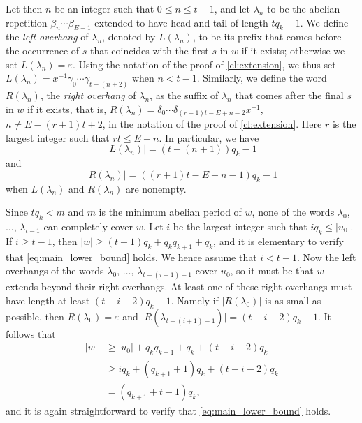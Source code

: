 \documentclass[a4paper,fleqn]{article}
\providecommand{\abs}[1]{\lvert#1\rvert}
\begin{document}
  Let then $n$ be an integer such that $0 \leq n \leq t - 1$, and let $\lambda_n$ to be the abelian repetition
  $\beta_n \dotsm \beta_{E-1}$ extended to have head and tail of length $tq_k - 1$. We define the \emph{left overhang}
  of $\lambda_n$, denoted by $L(\lambda_n)$, to be its prefix that comes before the occurrence of $s$ that coincides
  with the first $s$ in $w$ if it exists; otherwise we set $L(\lambda_n) = \varepsilon$. Using the notation of the
  proof of \autoref{cl:extension}, we thus set $L(\lambda_n) = x^{-1} \gamma_0 \dotsm \gamma_{t - (n + 2)}$ when
  $n < t - 1$. Similarly, we define the word $R(\lambda_n)$, the \emph{right overhang} of $\lambda_n$, as the suffix of
  $\lambda_n$ that comes after the final $s$ in $w$ if it exists, that is, $R(\lambda_n) = \delta_0 \dotsm
  \delta_{(r+1)t - E + n - 2}x^{-1}$, $n \neq E - (r + 1)t + 2$, in the notation of the proof of
  \autoref{cl:extension}. Here $r$ is the largest integer such that $rt \leq E - n$. In particular, we have
  \begin{equation*}
    \abs{L(\lambda_n)} = (t - (n + 1))q_k - 1
  \end{equation*}
  and
  \begin{equation*}
    \abs{R(\lambda_n)} = ((r + 1)t - E + n - 1)q_k - 1
  \end{equation*}
  when $L(\lambda_n)$ and $R(\lambda_n)$ are nonempty.

  Since $tq_k < m$ and $m$ is the minimum abelian period of $w$, none of the words $\lambda_0$, $\ldots$,
  $\lambda_{t-1}$ can completely cover $w$. Let $i$ be the largest integer such that $iq_k \leq \abs{u_0}$. If
  $i \geq t - 1$, then $\abs{w} \geq (t - 1)q_k + q_k q_{k+1} + q_k$, and it is elementary to verify that
  \eqref{eq:main_lower_bound} holds. We hence assume that $i < t - 1$. Now the left overhangs of the words $\lambda_0$,
  $\ldots$, $\lambda_{t - (i + 1) - 1}$ cover $u_0$, so it must be that $w$ extends beyond their right overhangs. At
  least one of these right overhangs must have length at least $(t - i - 2)q_k - 1$. Namely if $\abs{R(\lambda_0)}$ is
  as small as possible, then $R(\lambda_0) = \varepsilon$ and
  $\abs{R(\lambda_{t - (i + 1) - 1})} = (t - i - 2)q_k - 1$. It follows that
  \begin{align*}
    \abs{w} &\geq \abs{u_0} + q_k q_{k+1} + q_k + (t - i - 2)q_k \\
            &\geq iq_k + (q_{k+1} + 1)q_k + (t - i - 2)q_k \\
            &= (q_{k+1} + t - 1)q_k,
  \end{align*}
  and it is again straightforward to verify that \eqref{eq:main_lower_bound} holds.
\end{document}
